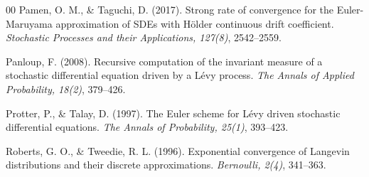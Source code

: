 \documentclass[11pt]{elsarticle}
\begin{document}
\begin{thebibliography}{00}
	 Pamen, O. M., \& Taguchi, D. (2017). Strong rate of convergence for the Euler-Maruyama approximation of SDEs with H\"{o}lder continuous drift coefficient. \textit{Stochastic Processes and their Applications, 127(8)}, 2542--2559. 
	
	 Panloup, F. (2008). Recursive computation of the invariant measure of a stochastic differential equation driven by a L\'{e}vy process. \textit{The Annals of Applied Probability, 18(2)}, 379--426. 
	
	 Protter, P., \& Talay, D. (1997). The Euler scheme for L\'{e}vy driven stochastic differential equations. \textit{The Annals of Probability, 25(1)}, 393--423. 
	
	 Roberts, G. O., \& Tweedie, R. L. (1996). Exponential convergence of Langevin distributions and their discrete approximations. \textit{Bernoulli, 2(4)}, 341--363.


\end{thebibliography}
\end{document}
